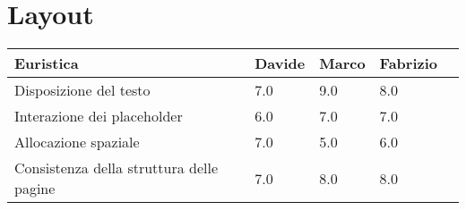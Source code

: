     \section{Layout}
    \begin{table}[H]
        \begin{tabular}{|l|l|l|l|l|}
        \hline \textbf{Euristica} & \textbf{Davide} & \textbf{Marco} &
        \textbf{Fabrizio} \\ \hline
        Disposizione del testo                      & 7.0   & 9.0   & 8.0   \\ \hline
        Interazione dei placeholder                 & 6.0   & 7.0   & 7.0   \\ \hline
        Allocazione spaziale                        & 7.0   & 5.0   & 6.0   \\ \hline
        Consistenza della struttura delle pagine    & 7.0   & 8.0   & 8.0   \\ \hline
        \hline
        \end{tabular}
    \end{table}